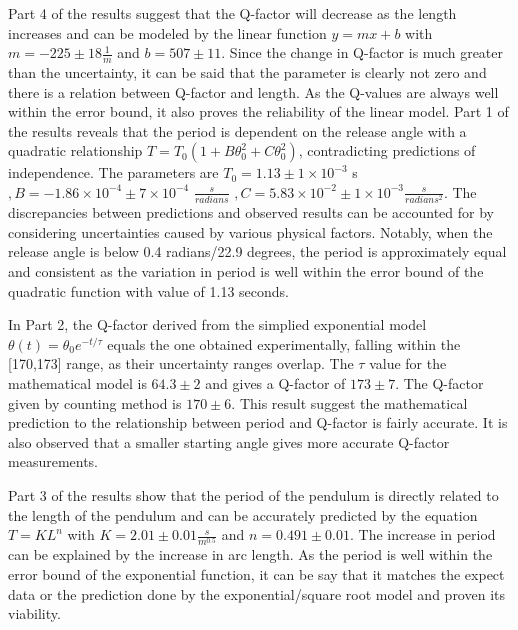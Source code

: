 \documentclass{article}
\begin{document}
Part 4 of the results suggest that the Q-factor will decrease as the length increases and can be modeled by the linear function $y = mx + b$ with $m = -225 \pm 18\frac{1}{m}$ and $b = 507 \pm 11$. Since the change in Q-factor is much greater than the uncertainty, it can be said that the parameter is clearly not zero and there is a relation between Q-factor and length. As the Q-values are always well within the error bound, it also proves the reliability of the linear model.
Part 1 of the results reveals that the period is dependent on the release angle with a quadratic relationship $T = T_0(1 + B\theta_0^2 + C\theta_0^2)$, contradicting predictions of independence. The parameters are $T_0 = 1.13  \pm 1\times10^{-3} $ s $, B = -1.86\times10^{-4}  \pm 7\times10^{-4}$ $\frac{s}{radians}$ $, C = 5.83\times10^{-2} \pm 1\times10^{-3} \frac{s}{radians^2}$. The discrepancies between predictions and observed results can be accounted for by considering uncertainties caused by various physical factors. Notably, when the release angle is below 0.4 radians/22.9 degrees, the period is approximately equal and consistent as the variation in period is well within the error bound of the quadratic function with value of 1.13 seconds.

In Part 2, the Q-factor derived from the simplied exponential model $\theta(t) = \theta_0 e^{-t/\tau}$ equals the one obtained experimentally, falling within the [170,173] range, as their uncertainty ranges overlap. The $\tau$ value for the mathematical model  is $64.3 \pm 2$ and gives a Q-factor of $173 \pm 7$. The Q-factor given by counting method is $170 \pm 6$. This result suggest the mathematical prediction to the relationship between period and Q-factor is fairly accurate. It is also observed that a smaller starting angle gives more accurate Q-factor measurements.

Part 3 of the results show that the period of the pendulum is directly related to the length of the pendulum and can be accurately predicted by the equation $T = KL^n$ with $K = 2.01 \pm 0.01\frac{s}{m^{0.5}}$ and $n = 0.491 \pm 0.01$. The increase in period can be explained by the increase in arc length. As the period is well within the error bound of the exponential function, it can be say that it matches the expect data or the prediction done by the exponential/square root model and proven its viability. 
\end{document}
